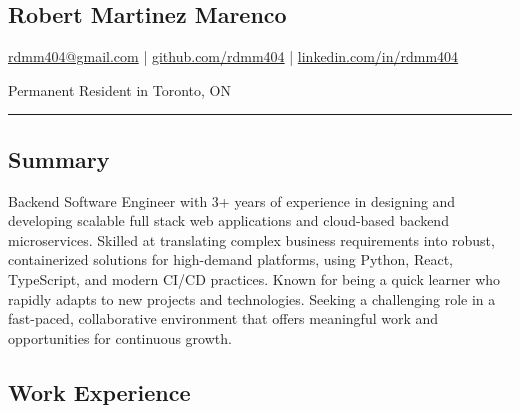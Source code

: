 \documentclass[a4paper,10pt]{article}
\begin{document}
\pagestyle{empty}

\begin{center}
  \section*{\LARGE Robert Martinez Marenco}
  \href{mailto:rdmm404@gmail.com}{rdmm404@gmail.com} |
  \href{https://github.com/rdmm404}{github.com/rdmm404} |
  \href{https://linkedin.com/in/rdmm404}{linkedin.com/in/rdmm404}

  Permanent Resident in Toronto, ON
\end{center}

\hrule
\vspace{4pt}

\subsection*{Summary}
Backend Software Engineer with 3+ years of experience in designing and developing scalable full stack web applications
and cloud-based backend microservices. Skilled at translating complex business requirements into robust, containerized solutions
for high-demand platforms, using Python, React, TypeScript, and modern CI/CD practices. Known for being a quick learner
who rapidly adapts to new projects and technologies. Seeking a challenging role in a fast-paced,
collaborative environment that offers meaningful work and opportunities for continuous growth.
\subsection*{Work Experience}
\end{document}
